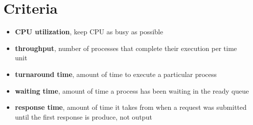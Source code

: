 \section{Criteria}
\begin{itemize}
\item \textbf{CPU utilization}, keep CPU as busy as possible
\item \textbf{throughput}, number of processes that complete their execution per time unit
\item \textbf{turnaround time}, amount of time to execute a particular process
\item \textbf{waiting time}, amount of time a process has been waiting in the ready queue
\item \textbf{response time}, amount of time it takes from when a request was submitted until the first response is produce, not output

\end{itemize}
